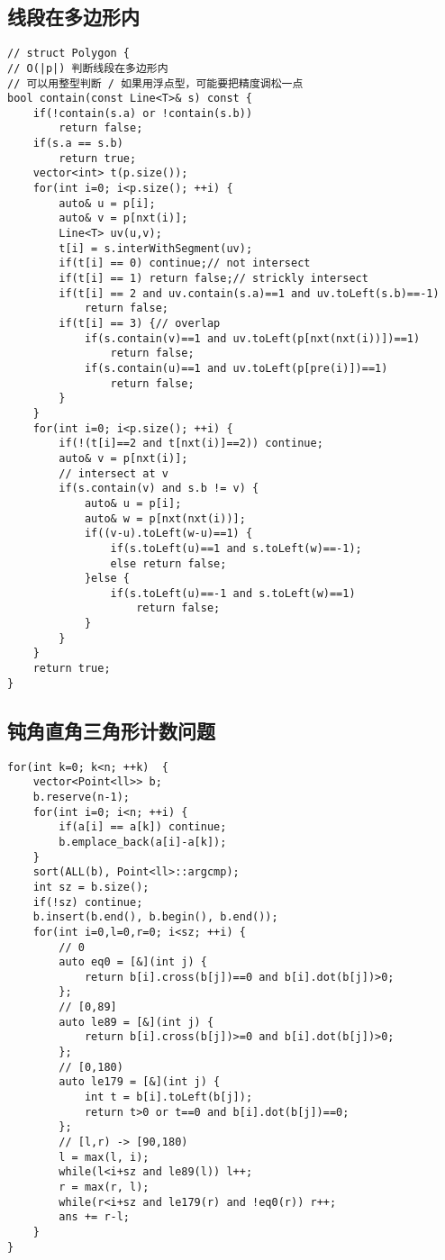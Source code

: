 \subsection{线段在多边形内}
\begin{lstlisting}
// struct Polygon {
// O(|p|) 判断线段在多边形内
// 可以用整型判断 / 如果用浮点型，可能要把精度调松一点
bool contain(const Line<T>& s) const {
    if(!contain(s.a) or !contain(s.b))
        return false;
    if(s.a == s.b)
        return true;
    vector<int> t(p.size());
    for(int i=0; i<p.size(); ++i) {
        auto& u = p[i];
        auto& v = p[nxt(i)];
        Line<T> uv(u,v);
        t[i] = s.interWithSegment(uv);
        if(t[i] == 0) continue;// not intersect
        if(t[i] == 1) return false;// strickly intersect
        if(t[i] == 2 and uv.contain(s.a)==1 and uv.toLeft(s.b)==-1)
            return false;
        if(t[i] == 3) {// overlap
            if(s.contain(v)==1 and uv.toLeft(p[nxt(nxt(i))])==1)
                return false;
            if(s.contain(u)==1 and uv.toLeft(p[pre(i)])==1)
                return false;
        }
    }
    for(int i=0; i<p.size(); ++i) {
        if(!(t[i]==2 and t[nxt(i)]==2)) continue;
        auto& v = p[nxt(i)];
        // intersect at v
        if(s.contain(v) and s.b != v) {
            auto& u = p[i];
            auto& w = p[nxt(nxt(i))];
            if((v-u).toLeft(w-u)==1) {
                if(s.toLeft(u)==1 and s.toLeft(w)==-1);
                else return false;
            }else {
                if(s.toLeft(u)==-1 and s.toLeft(w)==1)
                    return false;
            }
        }
    }
    return true;
}
\end{lstlisting}

\subsection{钝角直角三角形计数问题}
\begin{lstlisting}
for(int k=0; k<n; ++k)  {
    vector<Point<ll>> b;
    b.reserve(n-1);
    for(int i=0; i<n; ++i) {
        if(a[i] == a[k]) continue;
        b.emplace_back(a[i]-a[k]);
    }
    sort(ALL(b), Point<ll>::argcmp);
    int sz = b.size();
    if(!sz) continue;
    b.insert(b.end(), b.begin(), b.end());
    for(int i=0,l=0,r=0; i<sz; ++i) {
        // 0
        auto eq0 = [&](int j) {
            return b[i].cross(b[j])==0 and b[i].dot(b[j])>0;
        };
        // [0,89]
        auto le89 = [&](int j) {
            return b[i].cross(b[j])>=0 and b[i].dot(b[j])>0;
        };
        // [0,180)
        auto le179 = [&](int j) {
            int t = b[i].toLeft(b[j]);
            return t>0 or t==0 and b[i].dot(b[j])==0;
        };
        // [l,r) -> [90,180)
        l = max(l, i);
        while(l<i+sz and le89(l)) l++;
        r = max(r, l);
        while(r<i+sz and le179(r) and !eq0(r)) r++;
        ans += r-l;
    }
}
\end{lstlisting}

